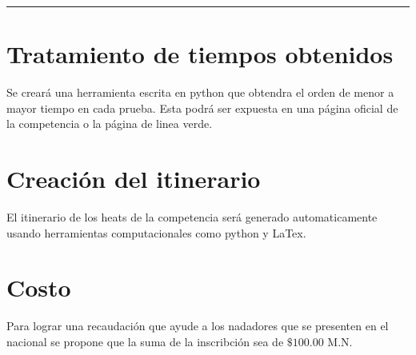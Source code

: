 \vspace{0.5cm}
\hrule

\section{Tratamiento de tiempos obtenidos}
Se creará una herramienta escrita en python que obtendra el orden de menor a mayor tiempo en cada prueba. Esta podrá ser expuesta en una página oficial de la competencia o la página de linea verde.


\section{Creación del itinerario}
El itinerario de los heats de la competencia será generado automaticamente usando herramientas computacionales como python y LaTex.

\section{Costo}
Para lograr una recaudación que ayude a los nadadores que se presenten en el nacional se propone que la suma de la inscribción sea de $\$100.00$ M.N.